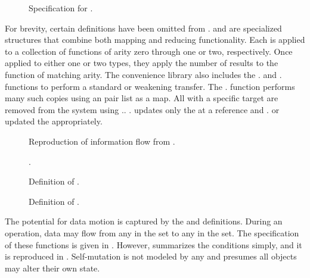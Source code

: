 \begin{figure}
  \COQDOCdoOpSpec{}
  \COQDOCdoOpSpecDoOp{}
  \caption{Specification for \COQdoOp{}. \label{fig:embed:doOp}}
\end{figure}

For brevity, certain definitions have been omitted from .
\COQoptionMapOne{} and \COQoptionMapTwo{} are specialized  structures that combine both mapping and reducing functionality.
Each is applied to a collection of functions of arity zero through one or two, respectively.
Once applied to either one or two  types, they apply the number of  results to the function of matching arity.
The \TMsystemState{} convenience library also includes the \COQSC{}.\COQcopyCap{} and \COQSC{}.\COQweakCopyCap{} functions to perform a standard or weakening \TMcap{} transfer.
The \COQSC{}.\COQcopyCapList{} function performs many such copies using an \TMidx{} pair list as a map.
All \TMcaps{} with a specific target are removed from the system using \COQSC{}.\COQrmCapsByTarget{}.
\COQSC{}.\COQupdateObj{} updates only the \TMobj{} at a reference and \COQSC{}.\COQsetAlive{} or \COQsetDead{} updated the \TMobjLabel{} appropriately. 

\begin{figure}
  \FIGflow{}
  \caption{Reproduction of information flow from .\label{fig:embed:flow}}
\end{figure}

\begin{figure}
  \COQDOCreadFromSpec{}
  \COQDOCreadFromDef{}
  \caption{Definition of \COQreadFrom{}. \label{fig:embed:readFrom}}.
\end{figure}

\begin{figure}
  \COQDOCwroteToSpec{}
  \COQDOCwroteToDef{}
  \caption{Definition of \COQwroteTo{}. \label{fig:embed:wroteTo}}
\end{figure}


The potential for data motion is captured by the \COQreadFrom{} and \COQwroteTo{} definitions.
During an operation, data may flow from any \TMobj{} in the \COQreadFrom{} set to any \TMobj{} in the \COQwroteTo{} set.
The specification of these functions is given in .
However,  summarizes the conditions simply, and it is reproduced in .
Self-mutation is not modeled by any \TMops{} and \TMmodelName{} presumes all \TMactive{} objects may alter their own state.

